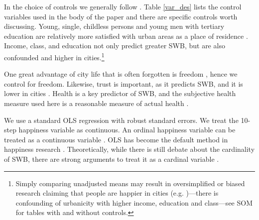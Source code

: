 \documentclass[11pt, letterpaper]{article}
\begin{document}


 
In the choice of controls we generally follow \citet{aok20}. Table \ref{var_des} lists the control variables used in the body of the
paper and there are specific controls worth discussing.
%
 Young, single, childless persons and young men with tertiary education are
 relatively more satisfied with urban areas as a place of residence \citep{anon-regional-studies-19}.
Income, class,  and education  not only predict greater
 SWB, but are also confounded and higher in cities.\footnote{Simply comparing
   unadjusted means may result in oversimplified or biased research claiming
   that people are happier in cities (e.g. \citep{burger20})---there is
   confounding of urbanicity with higher income, education and class---see SOM for tables with and without controls.} 

One great advantage of city life that is often forgotten is freedom %
 \citep[%
 ]{park84}, %
 hence we control for freedom. 
% 
Likewise, trust is important, as it predicts SWB, and it is lower in cities
 \citep{milgram70}.
%
Health is a key predictor of SWB, and the subjective health measure used here is a reasonable measure of actual health \citep{subramanian09b}.

We use a standard OLS regression with robust standard errors.  We treat the 10-step
happiness variable as continuous. An ordinal happiness variable can be treated as a
continuous variable \citep{carbonell04}.
%
OLS has become the default method in happiness research
\citep{blanchflower11}. Theoretically, while there is still debate about the
cardinality of SWB, there are strong arguments to treat it as a cardinal
variable \citep{ng96,ng97}. 




\end{document}
